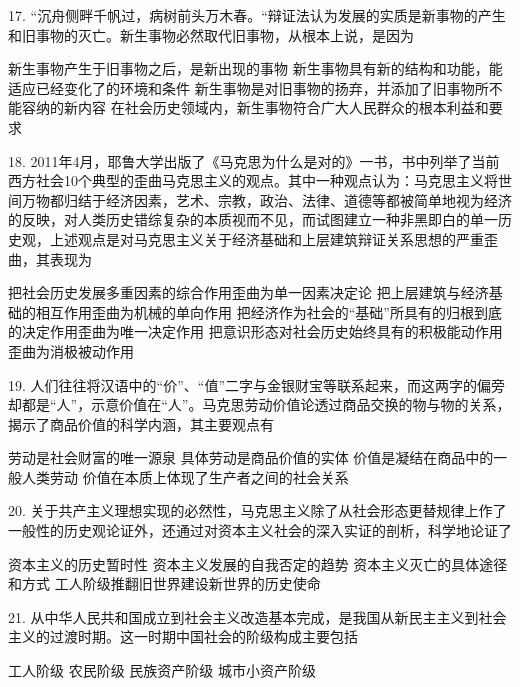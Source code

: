 17. “沉舟侧畔千帆过，病树前头万木春。“辩证法认为发展的实质是新事物的产生和旧事物的灭亡。新生事物必然取代旧事物，从根本上说，是因为
\begin{choices}
	 新生事物产生于旧事物之后，是新出现的事物
	 新生事物具有新的结构和功能，能适应已经变化了的环境和条件
	 新生事物是对旧事物的扬弃，并添加了旧事物所不能容纳的新内容
	 在社会历史领域内，新生事物符合广大人民群众的根本利益和要求
\end{choices}

18. 2011年4月，耶鲁大学出版了《马克思为什么是对的》一书，书中列举了当前西方社会10个典型的歪曲马克思主义的观点。其中一种观点认为：马克思主义将世间万物都归结于经济因素，艺术、宗教，政治、法律、道德等都被简单地视为经济的反映，对人类历史错综复杂的本质视而不见，而试图建立一种非黑即白的单一历史观，上述观点是对马克思主义关于经济基础和上层建筑辩证关系思想的严重歪曲，其表现为
\begin{choices}
	 把社会历史发展多重因素的综合作用歪曲为单一因素决定论
	 把上层建筑与经济基础的相互作用歪曲为机械的单向作用
	 把经济作为社会的“基础”所具有的归根到底的决定作用歪曲为唯一决定作用
	 把意识形态对社会历史始终具有的积极能动作用歪曲为消极被动作用
\end{choices}

19. 人们往往将汉语中的“价”、“值”二字与金银财宝等联系起来，而这两字的偏旁却都是“人”，示意价值在“人”。马克思劳动价值论透过商品交换的物与物的关系，揭示了商品价值的科学内涵，其主要观点有
\begin{choices}
	 劳动是社会财富的唯一源泉
	 具体劳动是商品价值的实体
	 价值是凝结在商品中的一般人类劳动
	 价值在本质上体现了生产者之间的社会关系
\end{choices}

20. 关于共产主义理想实现的必然性，马克思主义除了从社会形态更替规律上作了一般性的历史观论证外，还通过对资本主义社会的深入实证的剖析，科学地论证了
\begin{choices}
	 资本主义的历史暂时性
	 资本主义发展的自我否定的趋势
	 资本主义灭亡的具体途径和方式
	 工人阶级推翻旧世界建设新世界的历史使命
\end{choices}

21. 从中华人民共和国成立到社会主义改造基本完成，是我国从新民主主义到社会主义的过渡时期。这一时期中国社会的阶级构成主要包括
\begin{choices}
	 工人阶级
	 农民阶级
	 民族资产阶级
	 城市小资产阶级
\end{choices}

